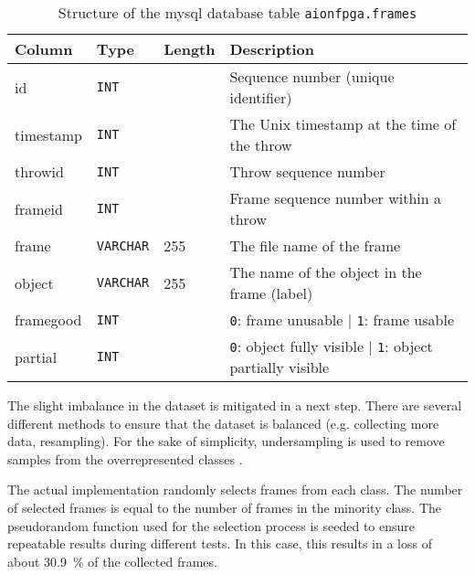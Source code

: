 \begin{table}
  \caption{Structure of the \acrshort{mysql} database table \texttt{aionfpga.frames}}
  \label{tab:tab_frames_structure}
  \centering
  \begin{tabular}{llll}
    \toprule
    \textbf{Column} & \textbf{Type} & \textbf{Length} & \textbf{Description} \\
    \midrule
    id & \texttt{INT} &  & Sequence number (unique identifier) \\
    timestamp & \texttt{INT} &  & The Unix timestamp at the time of the throw \\
    throwid & \texttt{INT} &  & Throw sequence number \\
    frameid & \texttt{INT} &  & Frame sequence number within a throw \\
    frame & \texttt{VARCHAR} & 255 & The file name of the frame \\
    object & \texttt{VARCHAR} & 255 & The name of the object in the frame (label) \\
    framegood & \texttt{INT} &  & \texttt{0}: frame unusable | \texttt{1}: frame usable \\
    partial & \texttt{INT} &  & \texttt{0}: object fully visible | \texttt{1}: object partially visible \\
    \bottomrule
  \end{tabular}
\end{table}

The slight imbalance in the dataset is mitigated in a next step.
There are several different methods to ensure that the dataset is balanced (e.g. collecting more data, resampling).
For the sake of simplicity, undersampling is used to remove samples from the overrepresented classes \cite{training_imbalanced}.

The actual implementation randomly selects frames from each class. %
The number of selected frames is equal to the number of frames in the minority class.
The pseudorandom function used for the selection process is seeded to ensure repeatable results during different tests.
In this case, this results in a loss of about \SI{30.9}{\percent} of the collected frames.

